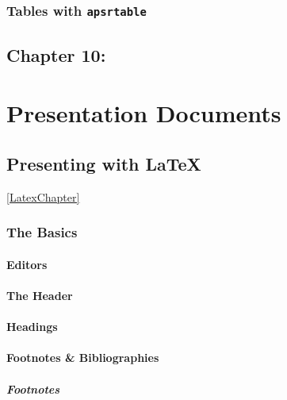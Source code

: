 \documentclass[ChapterTOCs,krantz1]{krantz}\usepackage{graphicx, color}
\begin{document}
\section{Tables with \texttt{apsrtable}}






\chapter{Chapter 10:}


\part{Presentation Documents}





\chapter{Presenting with \LaTeX}\ref{LatexChapter}

\section{The Basics}

\subsection{Editors}

\subsection{The Header}

\subsection{Headings}

\subsection{Footnotes \& Bibliographies}

\subsubsection{Footnotes}
\end{document}
